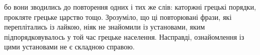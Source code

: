 бо вони зводились до повторення одних і тих же слів: каторжні грецькі порядки, прокляте грецьке царство тощо. Зрозуміло,
що ці повторювані фрази, які переплітались із лайкою, ніяк не знайомили із установами, яким підпорядковувалось у той час
грецьке населення. Насправді, ознайомлення із цими установами не є складною справою.
